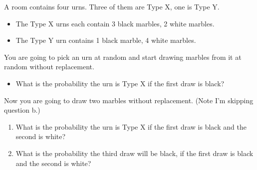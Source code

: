 \documentclass[
  11pt,
]{article}
\providecommand{\tightlist}{%
  \setlength{\itemsep}{0pt}\setlength{\parskip}{0pt}}
\begin{document}
A room contains four urns. Three of them are Type X, one is Type Y.

\begin{itemize}
\tightlist
\item
  The Type X urns each contain 3 black marbles, 2 white marbles.
\item
  The Type Y urn contains 1 black marble, 4 white marbles.
\end{itemize}

You are going to pick an urn at random and start drawing marbles from it
at random without replacement.

\begin{itemize}
\tightlist
\item
  What is the probability the urn is Type X if the first draw is black?
\end{itemize}

Now you are going to draw two marbles without replacement. (Note I'm
skipping question b.)

\begin{enumerate}
\def\labelenumi{\alph{enumi}.}
\tightlist
\item
  What is the probability the urn is Type X if the first draw is black
  and the second is white? \setcounter{enumi}{2}
\item
  What is the probability the third draw will be black, if the first
  draw is black and the second is white?
\end{enumerate}
\end{document}
